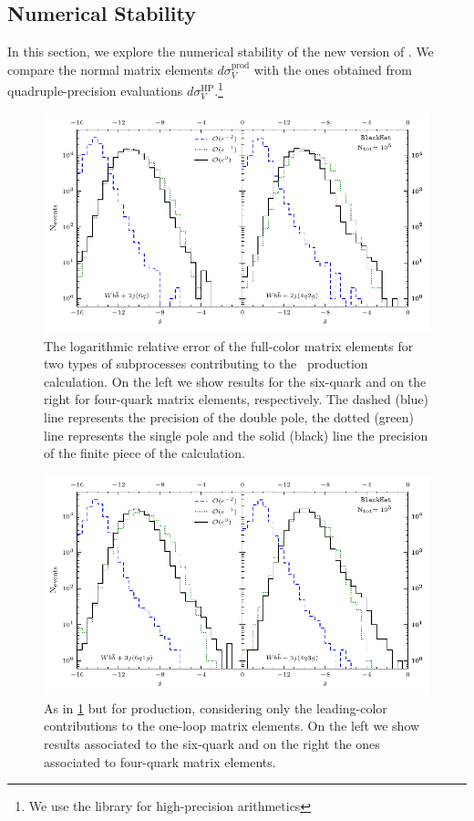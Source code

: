 \subsection{Numerical Stability}
%
In this section, we explore the numerical stability of the new version of \BlackHat{}.
We compare the normal matrix elements $d\sigma_V^\mathrm{prod}$ with the ones obtained from quadruple-precision evaluations $d\sigma_V^\mathrm{HP}$.\footnote{
  We use the \cite{QD} library for high-precision arithmetics
}

\begin{figure}[h]
  \centering
  \includegraphics[scale=1.1]{plots/numstab2j}
  \caption{
    The logarithmic relative error of the full-color matrix elements
    for two types of subprocesses contributing to the \Wbbjj~production calculation. On the
    left we show results for the
    six-quark and on the right for four-quark matrix elements, respectively.
    The dashed (blue) line represents the precision of the double pole, the dotted
    (green) line represents the single pole and the
  solid (black) line the precision of the finite piece of the calculation.}
  \label{fig:stabilityWbb2j}
\end{figure}
\begin{figure}[h]
  \centering
  \includegraphics[scale=1.1]{plots/numstab3j}
  \caption{As in \cref{fig:stabilityWbb2j} but for \Wbbjjj{} production,
  considering only the leading-color contributions to the one-loop matrix elements.
  On the left we show results associated to the six-quark and on the right the ones associated to
four-quark matrix elements.}
\label{fig:stabilityWbb3j}
\end{figure}


